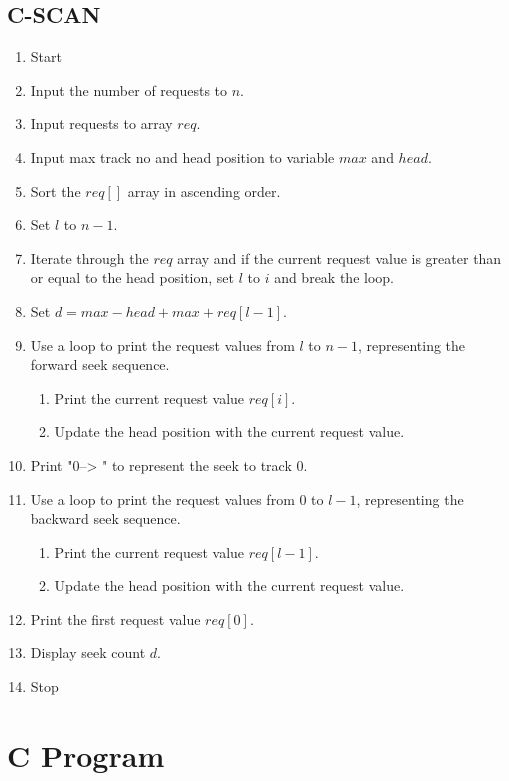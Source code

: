 \subsection{C-SCAN}
\begin{enumerate}
    \item Start
    \item Input the number of requests to $n$.
    \item Input requests to array $req$.
    \item Input max track no and head position to variable $max$ and $head$.
    \item Sort the $req[]$ array in ascending order.
    \item Set $l$ to $n-1$.
    \item Iterate through the $req$ array and if the current request value is greater than or equal to the head position, set $l$ to $i$ and break the loop.
    \item Set $d = max - head + max + req[l-1]$.
    \item Use a loop to print the request values from $l$ to $n-1$, representing the forward seek sequence.
    \begin{enumerate}
        \item Print the current request value $req[i]$.
        \item Update the head position with the current request value.
    \end{enumerate}
    \item Print "0-->
" to represent the seek to track 0.
    \item Use a loop to print the request values from 0 to $l-1$, representing the backward seek sequence.
    \begin{enumerate}
        \item Print the current request value $req[l-1]$.
        \item Update the head position with the current request value.
    \end{enumerate}
    \item Print the first request value $req[0]$.
    \item Display seek count $d$.
    \item Stop
\end{enumerate}


\section{C Program}

